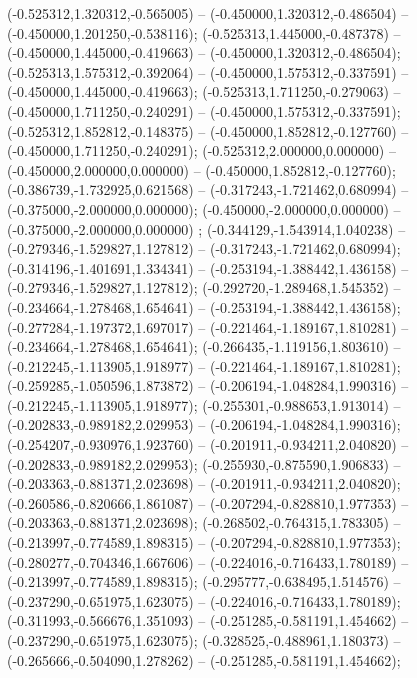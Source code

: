  (-0.525312,1.320312,-0.565005) -- (-0.450000,1.320312,-0.486504) -- (-0.450000,1.201250,-0.538116);
 (-0.525313,1.445000,-0.487378) -- (-0.450000,1.445000,-0.419663) -- (-0.450000,1.320312,-0.486504);
 (-0.525313,1.575312,-0.392064) -- (-0.450000,1.575312,-0.337591) -- (-0.450000,1.445000,-0.419663);
 (-0.525313,1.711250,-0.279063) -- (-0.450000,1.711250,-0.240291) -- (-0.450000,1.575312,-0.337591);
 (-0.525312,1.852812,-0.148375) -- (-0.450000,1.852812,-0.127760) -- (-0.450000,1.711250,-0.240291);
 (-0.525312,2.000000,0.000000) -- (-0.450000,2.000000,0.000000) -- (-0.450000,1.852812,-0.127760);
 (-0.386739,-1.732925,0.621568) -- (-0.317243,-1.721462,0.680994) -- (-0.375000,-2.000000,0.000000);
 (-0.450000,-2.000000,0.000000) -- (-0.375000,-2.000000,0.000000) ;
 (-0.344129,-1.543914,1.040238) -- (-0.279346,-1.529827,1.127812) -- (-0.317243,-1.721462,0.680994);
 (-0.314196,-1.401691,1.334341) -- (-0.253194,-1.388442,1.436158) -- (-0.279346,-1.529827,1.127812);
 (-0.292720,-1.289468,1.545352) -- (-0.234664,-1.278468,1.654641) -- (-0.253194,-1.388442,1.436158);
 (-0.277284,-1.197372,1.697017) -- (-0.221464,-1.189167,1.810281) -- (-0.234664,-1.278468,1.654641);
 (-0.266435,-1.119156,1.803610) -- (-0.212245,-1.113905,1.918977) -- (-0.221464,-1.189167,1.810281);
 (-0.259285,-1.050596,1.873872) -- (-0.206194,-1.048284,1.990316) -- (-0.212245,-1.113905,1.918977);
 (-0.255301,-0.988653,1.913014) -- (-0.202833,-0.989182,2.029953) -- (-0.206194,-1.048284,1.990316);
 (-0.254207,-0.930976,1.923760) -- (-0.201911,-0.934211,2.040820) -- (-0.202833,-0.989182,2.029953);
 (-0.255930,-0.875590,1.906833) -- (-0.203363,-0.881371,2.023698) -- (-0.201911,-0.934211,2.040820);
 (-0.260586,-0.820666,1.861087) -- (-0.207294,-0.828810,1.977353) -- (-0.203363,-0.881371,2.023698);
 (-0.268502,-0.764315,1.783305) -- (-0.213997,-0.774589,1.898315) -- (-0.207294,-0.828810,1.977353);
 (-0.280277,-0.704346,1.667606) -- (-0.224016,-0.716433,1.780189) -- (-0.213997,-0.774589,1.898315);
 (-0.295777,-0.638495,1.514576) -- (-0.237290,-0.651975,1.623075) -- (-0.224016,-0.716433,1.780189);
 (-0.311993,-0.566676,1.351093) -- (-0.251285,-0.581191,1.454662) -- (-0.237290,-0.651975,1.623075);
 (-0.328525,-0.488961,1.180373) -- (-0.265666,-0.504090,1.278262) -- (-0.251285,-0.581191,1.454662);
